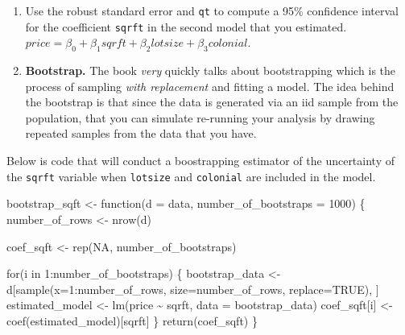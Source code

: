 \documentclass[
  letterpaper,
  DIV=11,
  numbers=noendperiod]{scrreprt}
\newenvironment{Shaded}{\begin{snugshade}}{\end{snugshade}}
\newcommand{\AttributeTok}[1]{\textcolor[rgb]{0.40,0.45,0.13}{#1}}
\newcommand{\ConstantTok}[1]{\textcolor[rgb]{0.56,0.35,0.01}{#1}}
\newcommand{\ControlFlowTok}[1]{\textcolor[rgb]{0.00,0.23,0.31}{#1}}
\newcommand{\DecValTok}[1]{\textcolor[rgb]{0.68,0.00,0.00}{#1}}
\newcommand{\FunctionTok}[1]{\textcolor[rgb]{0.28,0.35,0.67}{#1}}
\newcommand{\NormalTok}[1]{\textcolor[rgb]{0.00,0.23,0.31}{#1}}
\newcommand{\OtherTok}[1]{\textcolor[rgb]{0.00,0.23,0.31}{#1}}
\newcommand{\SpecialCharTok}[1]{\textcolor[rgb]{0.37,0.37,0.37}{#1}}
\newcommand{\StringTok}[1]{\textcolor[rgb]{0.13,0.47,0.30}{#1}}
\begin{document}
\begin{enumerate}
\def\labelenumi{\arabic{enumi}.}
\setcounter{enumi}{3}
\item
  Use the robust standard error and \texttt{qt} to compute a 95\%
  confidence interval for the coefficient \texttt{sqrft} in the second
  model that you estimated.
  \(price = \beta_{0} + \beta_{1} sqrft + \beta_{2} lotsize + \beta_{3} colonial\).
\item
  \textbf{Bootstrap.} The book \emph{very} quickly talks about
  bootstrapping which is the process of sampling \emph{with replacement}
  and fitting a model. The idea behind the bootstrap is that since the
  data is generated via an iid sample from the population, that you can
  simulate re-running your analysis by drawing repeated samples from the
  data that you have.
\end{enumerate}

Below is code that will conduct a boostrapping estimator of the
uncertainty of the \texttt{sqrft} variable when \texttt{lotsize} and
\texttt{colonial} are included in the model.

\begin{Shaded}
\begin{Highlighting}[]
\NormalTok{bootstrap\_sqft }\OtherTok{\textless{}{-}} \ControlFlowTok{function}\NormalTok{(}\AttributeTok{d =}\NormalTok{ data, }\AttributeTok{number\_of\_bootstraps =} \DecValTok{1000}\NormalTok{) \{ }
\NormalTok{  number\_of\_rows }\OtherTok{\textless{}{-}} \FunctionTok{nrow}\NormalTok{(d)}

\NormalTok{    coef\_sqft }\OtherTok{\textless{}{-}} \FunctionTok{rep}\NormalTok{(}\ConstantTok{NA}\NormalTok{, number\_of\_bootstraps)}

    \ControlFlowTok{for}\NormalTok{(i }\ControlFlowTok{in} \DecValTok{1}\SpecialCharTok{:}\NormalTok{number\_of\_bootstraps) \{ }
\NormalTok{      bootstrap\_data }\OtherTok{\textless{}{-}}\NormalTok{ d[}\FunctionTok{sample}\NormalTok{(}\AttributeTok{x=}\DecValTok{1}\SpecialCharTok{:}\NormalTok{number\_of\_rows, }\AttributeTok{size=}\NormalTok{number\_of\_rows, }\AttributeTok{replace=}\ConstantTok{TRUE}\NormalTok{), ]  }
\NormalTok{      estimated\_model }\OtherTok{\textless{}{-}} \FunctionTok{lm}\NormalTok{(price }\SpecialCharTok{\textasciitilde{}}\NormalTok{ sqrft, }\AttributeTok{data =}\NormalTok{ bootstrap\_data)}
\NormalTok{      coef\_sqft[i]    }\OtherTok{\textless{}{-}} \FunctionTok{coef}\NormalTok{(estimated\_model)[}\StringTok{\textquotesingle{}sqrft\textquotesingle{}}\NormalTok{]}
\NormalTok{    \}}
  \FunctionTok{return}\NormalTok{(coef\_sqft)}
\NormalTok{\}}
\end{Highlighting}
\end{Shaded}
\end{document}
